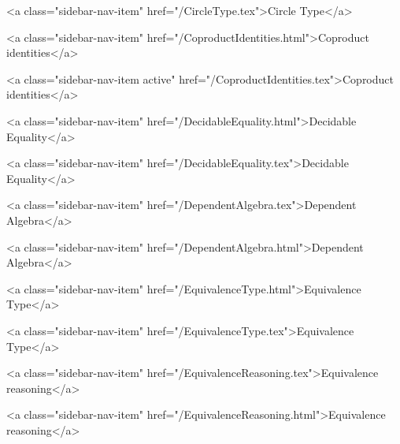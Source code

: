       
        
          <a class="sidebar-nav-item" href="/CircleType.tex">Circle Type</a>
        
      
    
      
        
          <a class="sidebar-nav-item" href="/CoproductIdentities.html">Coproduct identities</a>
        
      
    
      
        
          <a class="sidebar-nav-item active" href="/CoproductIdentities.tex">Coproduct identities</a>
        
      
    
      
        
          <a class="sidebar-nav-item" href="/DecidableEquality.html">Decidable Equality</a>
        
      
    
      
        
          <a class="sidebar-nav-item" href="/DecidableEquality.tex">Decidable Equality</a>
        
      
    
      
        
          <a class="sidebar-nav-item" href="/DependentAlgebra.tex">Dependent Algebra</a>
        
      
    
      
        
          <a class="sidebar-nav-item" href="/DependentAlgebra.html">Dependent Algebra</a>
        
      
    
      
        
          <a class="sidebar-nav-item" href="/EquivalenceType.html">Equivalence Type</a>
        
      
    
      
        
          <a class="sidebar-nav-item" href="/EquivalenceType.tex">Equivalence Type</a>
        
      
    
      
        
          <a class="sidebar-nav-item" href="/EquivalenceReasoning.tex">Equivalence reasoning</a>
        
      
    
      
        
          <a class="sidebar-nav-item" href="/EquivalenceReasoning.html">Equivalence reasoning</a>
        
